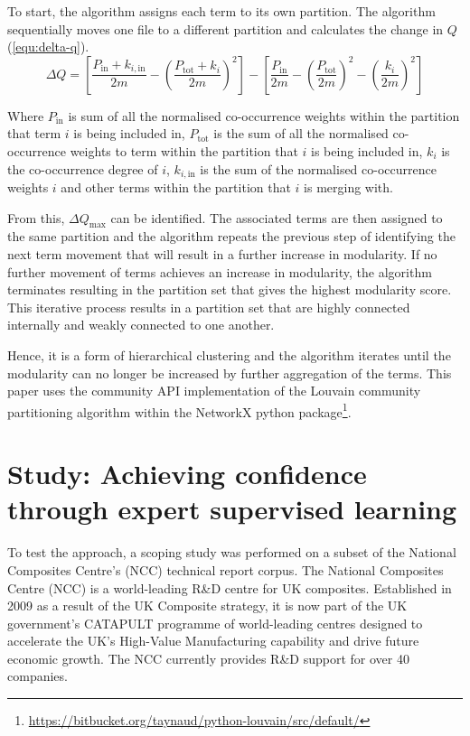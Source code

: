\documentclass[a4paper, 11pt]{article}
\begin{document}
To start, the algorithm assigns each term to its own partition.
The algorithm sequentially moves one file to a different partition and calculates the change in $Q$ (\cref{equ:delta-q}).
\begin{equation}
\Delta Q=\left[\frac{P_{\mathrm{in}}+k_{i,\mathrm{in}}}{2m}-\left(\frac{P_{\mathrm{tot}}+k_i}{2m}\right)^2\right]-\left[\frac{P_{\mathrm{in}}}{2m}-\left(\frac{P_{\mathrm{tot}}}{2m}\right)^2-\left(\frac{k_i}{2m}\right)^2\right]
\label{equ:delta-q}
\end{equation}

Where $P_{\mathrm{in}}$ is sum of all the normalised co-occurrence weights within the partition that term $i$ is being included in, $P_{\mathrm{tot}}$ is the sum of all the normalised co-occurrence weights to term within the partition that $i$ is being included in, $k_i$ is the co-occurrence degree of $i$, $k_{i,\mathrm{in}}$ is the sum of the normalised co-occurrence weights $i$ and other terms within the partition that $i$ is merging with.

From this, $\Delta Q_{\mathrm{max}}$ can be identified. The associated terms are then assigned to the same partition and the algorithm repeats the previous step of identifying the next term movement that will result in a further increase in modularity. If no further movement of terms achieves an increase in modularity, the algorithm terminates resulting in the partition set that gives the highest modularity score. This iterative process results in a partition set that are highly connected internally and weakly connected to one another.

Hence, it is a form of hierarchical clustering and the algorithm iterates until the modularity can no longer be increased by further aggregation of the terms. This paper uses the community API implementation of the Louvain community partitioning algorithm within the NetworkX python package\footnote{\url{https://bitbucket.org/taynaud/python-louvain/src/default/}}.


\section{Study: Achieving confidence through expert supervised learning}\label{sec:study}

To test the approach, a scoping study was performed on a subset of the National Composites Centre’s (NCC) technical report corpus. The National Composites Centre (NCC) is a world-leading R\&D centre for UK composites. Established in 2009 as a result of the UK Composite strategy, it is now part of the UK government’s CATAPULT programme of world-leading centres designed to accelerate the UK’s High-Value Manufacturing capability and drive future economic growth. The NCC currently provides R\&D support for over 40 companies.
\end{document}
